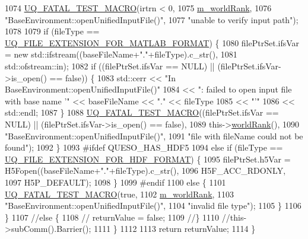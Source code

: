 \begin{DoxyCode}
1074       \hyperlink{_defines_8h_a56d63d18d0a6d45757de47fcc06f574d}{UQ\_FATAL\_TEST\_MACRO}(irtrn < 0,
1075                           \hyperlink{class_q_u_e_s_o_1_1_base_environment_a464cab923ada0e14c6e3a4000c2ea385}{m\_worldRank},
1076                           \textcolor{stringliteral}{"BaseEnvironment::openUnifiedInputFile()"},
1077                           \textcolor{stringliteral}{"unable to verify input path"});
1078 
1079       \textcolor{keywordflow}{if} (fileType == \hyperlink{_defines_8h_ac440026eff7deb1c1eed1eea0e8e36ba}{UQ\_FILE\_EXTENSION\_FOR\_MATLAB\_FORMAT}) \{
1080         filePtrSet.ifsVar = \textcolor{keyword}{new} std::ifstream((baseFileName+\textcolor{stringliteral}{"."}+fileType).c\_str(),
1081                                               std::ofstream::in);
1082         \textcolor{keywordflow}{if} ((filePtrSet.ifsVar == NULL) || (filePtrSet.ifsVar->is\_open() == \textcolor{keyword}{false})) \{
1083           std::cerr << \textcolor{stringliteral}{"In BaseEnvironment::openUnifiedInputFile()"}
1084                     << \textcolor{stringliteral}{": failed to open input file with base name '"} << baseFileName << \textcolor{stringliteral}{"."} << fileType
1085                     << \textcolor{stringliteral}{"'"}
1086                     << std::endl;
1087         \}
1088         \hyperlink{_defines_8h_a56d63d18d0a6d45757de47fcc06f574d}{UQ\_FATAL\_TEST\_MACRO}((filePtrSet.ifsVar == NULL) || (filePtrSet.ifsVar->is\_open()
       == \textcolor{keyword}{false}),
1089                             this->\hyperlink{class_q_u_e_s_o_1_1_base_environment_a78b57112bbd0e6dd0e8afec00b40ffa7}{worldRank}(),
1090                             \textcolor{stringliteral}{"BaseEnvironment::openUnifiedInputFile()"},
1091                             \textcolor{stringliteral}{"file with fileName could not be found"});
1092       \}
1093 \textcolor{preprocessor}{#ifdef QUESO\_HAS\_HDF5}
1094 \textcolor{preprocessor}{}      \textcolor{keywordflow}{else} \textcolor{keywordflow}{if} (fileType == \hyperlink{_defines_8h_a4ebcc075277d031eb97c90b9a45f4493}{UQ\_FILE\_EXTENSION\_FOR\_HDF\_FORMAT}) \{
1095         filePtrSet.h5Var = H5Fopen((baseFileName+\textcolor{stringliteral}{"."}+fileType).c\_str(),
1096                                    H5F\_ACC\_RDONLY,
1097                                    H5P\_DEFAULT);
1098       \}
1099 \textcolor{preprocessor}{#endif}
1100 \textcolor{preprocessor}{}      \textcolor{keywordflow}{else} \{
1101         \hyperlink{_defines_8h_a56d63d18d0a6d45757de47fcc06f574d}{UQ\_FATAL\_TEST\_MACRO}(\textcolor{keyword}{true},
1102                             \hyperlink{class_q_u_e_s_o_1_1_base_environment_a464cab923ada0e14c6e3a4000c2ea385}{m\_worldRank},
1103                             \textcolor{stringliteral}{"BaseEnvironment::openUnifiedInputFile()"},
1104                             \textcolor{stringliteral}{"invalid file type"});
1105       \}
1106     \}
1107     \textcolor{comment}{//else \{}
1108     \textcolor{comment}{//  returnValue = false;}
1109     \textcolor{comment}{//\}}
1110     \textcolor{comment}{//this->subComm().Barrier();}
1111   \}
1112 
1113   \textcolor{keywordflow}{return} returnValue;
1114 \}
\end{DoxyCode}
